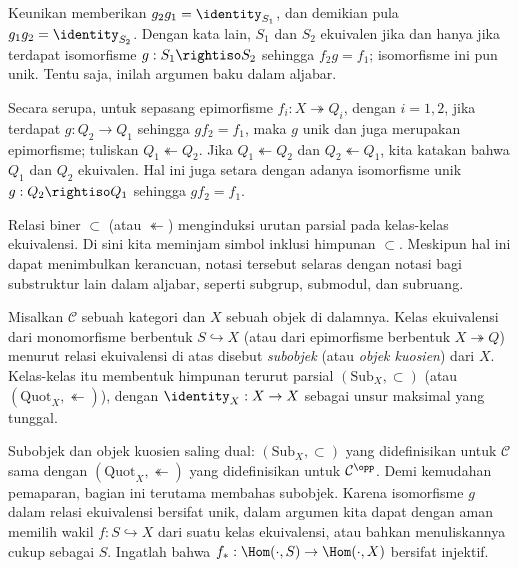Keunikan memberikan $g_2 g_1 = \identity_{S_1}$, dan demikian pula
$g_1 g_2 = \identity_{S_2}$. Dengan kata lain, $S_1$ dan $S_2$ ekuivalen jika
dan hanya jika terdapat isomorfisme $g: S_1 \rightiso S_2$ sehingga
$f_2 g = f_1$; isomorfisme ini pun unik. Tentu saja, inilah argumen baku
dalam aljabar.

Secara serupa, untuk sepasang epimorfisme
$f_i: X \twoheadrightarrow Q_i$, dengan $i = 1, 2$, jika terdapat
$g: Q_2 \to Q_1$ sehingga $g f_2 = f_1$, maka $g$ unik dan juga merupakan
epimorfisme; tuliskan $Q_1 \twoheadleftarrow Q_2$. Jika
$Q_1 \twoheadleftarrow Q_2$ dan $Q_2 \twoheadleftarrow Q_1$, kita katakan bahwa
$Q_1$ dan $Q_2$ ekuivalen. Hal ini juga setara dengan adanya isomorfisme unik
$g: Q_2 \rightiso Q_1$ sehingga $g f_2 = f_1$.

Relasi biner $\subset$ (atau $\twoheadleftarrow$) menginduksi urutan parsial
pada kelas-kelas ekuivalensi. Di sini kita meminjam simbol inklusi himpunan
$\subset$. Meskipun hal ini dapat menimbulkan kerancuan, notasi tersebut
selaras dengan notasi bagi substruktur lain dalam aljabar, seperti subgrup,
submodul, dan subruang.

\begin{definisi}\label{def:sub-quot-obj}
	 
	 
	Misalkan $\mathcal{C}$ sebuah kategori dan $X$ sebuah objek di dalamnya. Kelas
	ekuivalensi dari monomorfisme berbentuk $S \hookrightarrow X$ (atau dari epimorfisme
	berbentuk $X \twoheadrightarrow Q$) menurut relasi ekuivalensi di atas
	disebut \emph{subobjek} (atau \emph{objek kuosien}) dari $X$. Kelas-kelas
	itu membentuk himpunan terurut parsial $(\mathrm{Sub}_X, \subset)$ (atau
	$(\mathrm{Quot}_X, \twoheadleftarrow)$), dengan
	$\identity_X: X \to X$ sebagai unsur maksimal yang tunggal.
\end{definisi}

Subobjek dan objek kuosien saling dual: $(\mathrm{Sub}_X, \subset)$ yang
didefinisikan untuk $\mathcal{C}$ sama dengan
$(\mathrm{Quot}_X, \twoheadleftarrow)$ yang didefinisikan untuk
$\mathcal{C}^{\opp}$. Demi kemudahan pemaparan, bagian ini terutama membahas
subobjek. Karena isomorfisme $g$ dalam relasi ekuivalensi bersifat unik, dalam
argumen kita dapat dengan aman memilih wakil $f: S \hookrightarrow X$ dari
suatu kelas ekuivalensi, atau bahkan menuliskannya cukup sebagai $S$.
Ingatlah bahwa $f_*: \Hom(\cdot, S) \to \Hom(\cdot, X)$ bersifat injektif.

